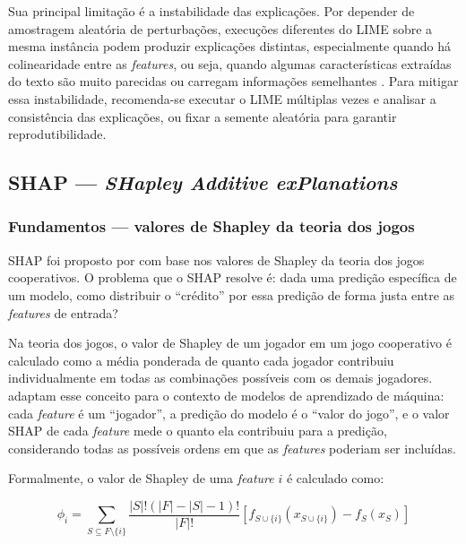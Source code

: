\documentclass[
    12pt,                %
    openright,           %
    oneside,             %
    a4paper,             %
    english,             %
    brazil               %
]{abntex2}
\begin{document}
Sua principal limitação é a instabilidade das explicações. Por 
depender de amostragem aleatória de perturbações, execuções diferentes 
do LIME sobre a mesma instância podem produzir explicações distintas, 
especialmente quando há colinearidade entre as \textit{features}, 
ou seja, quando algumas características extraídas do texto são muito 
parecidas ou carregam informações semelhantes \cite{salih2023}. Para 
mitigar essa instabilidade, recomenda-se executar o LIME múltiplas 
vezes e analisar a consistência das explicações, ou fixar a semente 
aleatória para garantir reprodutibilidade.

\subsection{SHAP — \textit{SHapley Additive exPlanations}}
\label{subsec:shap}

\subsubsection{Fundamentos — valores de Shapley da teoria dos jogos}
\label{subsubsec:shap_fundamentos}

SHAP foi proposto por  com base nos valores 
de Shapley da teoria dos jogos cooperativos. O problema que o SHAP 
resolve é: dada uma predição específica de um modelo, como distribuir 
o ``crédito'' por essa predição de forma justa entre as 
\textit{features} de entrada?

Na teoria dos jogos, o valor de Shapley de um jogador em um jogo 
cooperativo é calculado como a média ponderada de quanto cada jogador 
contribuiu individualmente em todas as combinações possíveis com os 
demais jogadores.  adaptam esse conceito 
para o contexto de modelos de aprendizado de máquina: cada 
\textit{feature} é um ``jogador'', a predição do modelo é o 
``valor do jogo'', e o valor SHAP de cada \textit{feature} mede 
o quanto ela contribuiu para a predição, considerando todas as 
possíveis ordens em que as \textit{features} poderiam ser incluídas.

Formalmente, o valor de Shapley de uma \textit{feature} $i$ 
é calculado como:

\begin{equation}
\phi_i = \sum_{S \subseteq F \setminus \{i\}} 
\frac{|S|!(|F| - |S| - 1)!}{|F|!} 
\left[ f_{S \cup \{i\}}(x_{S \cup \{i\}}) - f_S(x_S) \right]
\end{equation}
\end{document}
